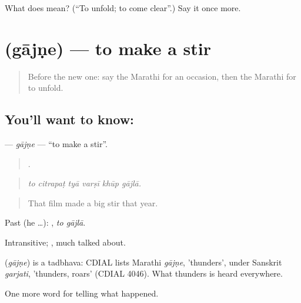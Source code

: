\begin{tcolorbox}[breakable,colback=teal!4,colframe=teal!35!black,title={Before you move on}]
What does  mean? (\textquotedblleft{}To unfold; to come clear\textquotedblright{}.) Say it once more.
\end{tcolorbox}
\section[\texorpdfstring{\mr{गाजणे} (gājṇe)}{गाजणे (gājṇe)}]{ (gājṇe) — to make a stir}

\label{lesson:MR-C304-gajne}



\begin{quote}
Before the new one: say the Marathi for an occasion, then the Marathi for to unfold.
\end{quote}

\subsection*{You'll want to know: }
\textbf{} — \emph{gājṇe} — \textquotedblleft{}to make a stir\textquotedblright{}.

\begin{quote}
     .
\end{quote}

\begin{quote}
\emph{to citrapaṭ tyā varṣī khūp gājlā.}
\end{quote}

\begin{quote}
That film made a big stir that year.
\end{quote}

Past (he …):  , \emph{to gājlā}.

Intransitive; , much talked about.

\begin{cousinweb}
\textbf{} (\emph{gājṇe}) is a tadbhava: CDIAL lists Marathi \emph{gājṇe}, 'thunders', under Sanskrit \emph{garjati}, 'thunders, roars' (CDIAL 4046). What thunders is heard everywhere.
\end{cousinweb}

\begin{grammarlens}[title={What you've built}]
One more word for telling what happened.
\end{grammarlens}

